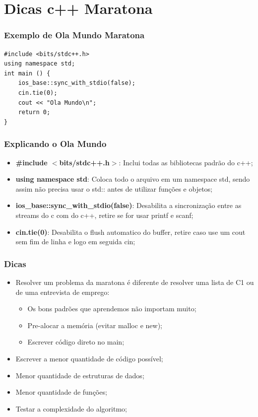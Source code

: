 \documentclass[12pt]{beamer}
\begin{document}
\section{Dicas c++ Maratona}\label{Dicas c++ Maratona}
\begin{frame}[t,fragile]{\insertsectionhead}
    \frametitle{Exemplo de Ola Mundo Maratona}
    \centering
    \begin{lstlisting}
#include <bits/stdc++.h>
using namespace std;
int main () {
    ios_base::sync_with_stdio(false);
    cin.tie(0);
    cout << "Ola Mundo\n";
    return 0;
}
    \end{lstlisting}
\end{frame}
\begin{frame}
    \frametitle{Explicando o Ola Mundo}
    \begin{itemize}
        \item\textbf{\#include $<$bits/stdc++.h$>$}: Inclui todas as bibliotecas padrão do c++;
        \item\textbf{using namespace std}: Coloca todo o arquivo em um namespace std, sendo assim não precisa usar o std:: antes de utilizar funções e objetos;
        \item\textbf{ios_base::sync_with_stdio(false)}: Desabilita a sincronização entre as streams do c com do c++, retire se for usar printf e scanf;
        \item\textbf{cin.tie(0)}: Desabilita o flush automatico do buffer, retire caso use um cout sem fim de linha e logo em seguida cin;
    \end{itemize}
\end{frame}

\begin{frame}
    \frametitle{Dicas}

    \begin{itemize}
        \item Resolver um problema da maratona é diferente de resolver uma lista de C1 ou de uma entrevista de emprego:
        \begin{itemize}
            \item Os bons padrões que aprendemos não importam muito;
            \item Pre-alocar a memória (evitar malloc e new);
            \item Escrever código direto no main;
        \end{itemize}
        \item Escrever a menor quantidade de código possível;
        \item Menor quantidade de estruturas de dados;
        \item Menor quantidade de funções;
        \item Testar a complexidade do algoritmo;
    \end{itemize}

\end{frame}
\end{document}
